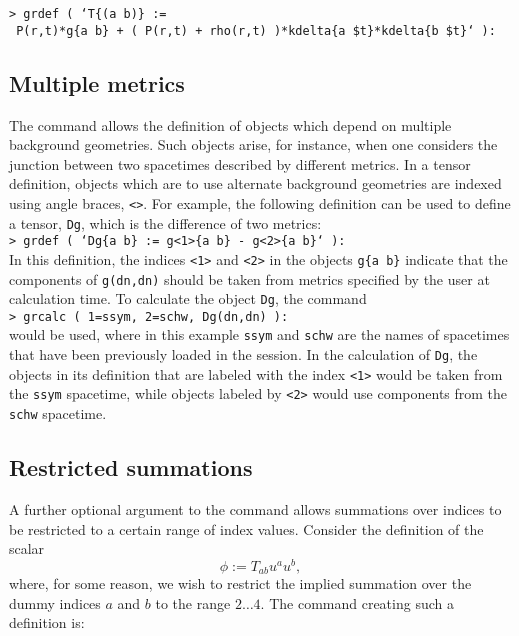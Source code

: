 \documentclass{article}
\begin{document}
\noindent\texttt{> grdef ( `T\{(a b)\} := }\\
\indent\texttt{\hspace{10mm} P(r,t)*g\{a b\}
  + ( P(r,t) + rho(r,t) )*kdelta\{a \$t\}*kdelta\{b \$t\}` ):}
%
\subsection*{Multiple metrics}
%
The  command allows the definition of objects which depend
on multiple background geometries. Such objects arise, for instance, when
one considers the junction between two spacetimes described by different
metrics. In a tensor definition, objects which are to use alternate
background geometries are indexed using angle braces, \texttt{<>}. For
example, the following definition can be used to define a tensor,
\texttt{Dg}, which is the difference of two metrics:\\

\noindent\texttt{> grdef ( `Dg\{a b\} := g<1>\{a b\} - g<2>\{a b\}` ):} \\

\noindent In this definition, the indices \texttt{<1>} and \texttt{<2>}
in the objects \texttt{g\{a b\}} indicate that the components of
\texttt{g(dn,dn)} should be taken from metrics specified by the user
at calculation time. To calculate the object \texttt{Dg}, the command\\

\noindent\texttt{> grcalc ( 1=ssym, 2=schw, Dg(dn,dn) ):}\\

\noindent would be used, where in this example \texttt{ssym} and 
\texttt{schw} are the names of spacetimes that have been
previously loaded in the session.  In the calculation of \texttt{Dg},
the objects in its definition that are labeled with the index
\texttt{<1>} would be taken from the \texttt{ssym} spacetime, while
objects labeled by \texttt{<2>} would use components from the
\texttt{schw} spacetime.
%
\iffalse
\subsection*{Restricted summations}\label{sec:restrictedsum}
%
A further optional argument to the  command allows
summations over indices to be restricted to a certain range of index
values.  Consider the definition of the scalar
\[
  \phi := T_{ab} u^a u^b,
\]
where, for some reason, we wish to restrict the implied summation over the
dummy indices $a$ and $b$ to the range $2\ldots 4$. The 
command creating such a definition is:\\
\end{document}
